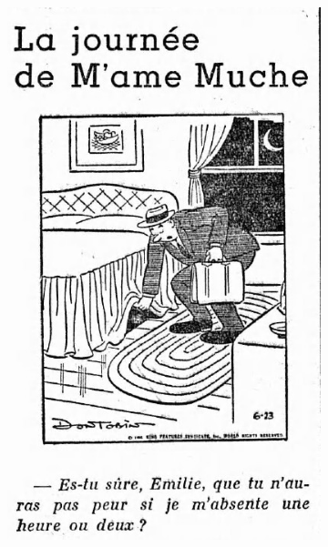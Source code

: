 \begin{figure}[ht]
\begin{subfigure}{0.25\textwidth}
    \end{subfigure}
    \hfill
    \begin{subfigure}{0.2\textwidth}
        \includegraphics[width=\linewidth]{Images/EXP-1956-07-25-a-i0105.jpg}
    \end{subfigure}
    \hfill
    \begin{subfigure}{0.3\textwidth}

\end{subfigure}
\end{figure}
